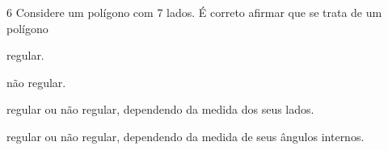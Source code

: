 





\num{6} Considere um polígono com 7 lados. É correto afirmar que se trata de um polígono

\begin{escolha}
\item regular.
\item não regular.
\item regular ou não regular, dependendo da medida dos seus
lados.
\item regular ou não regular, dependendo da medida de seus
ângulos internos.
\end{escolha}







